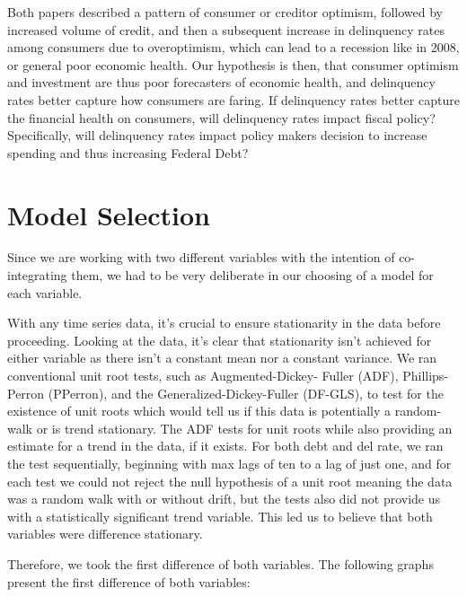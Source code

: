 \documentclass[11pt, oneside]{article}   	%
\begin{document}
	Both papers described a pattern of consumer or creditor optimism, followed by increased volume of credit, and then a subsequent increase in delinquency rates among consumers due to overoptimism, which can lead to a recession like in 2008, or general poor economic health. Our hypothesis is then, that consumer optimism and investment are thus poor forecasters of economic health, and delinquency rates better capture how consumers are faring. If delinquency rates better capture the financial health on consumers, will delinquency rates impact fiscal policy? Specifically, will delinquency rates impact policy makers decision to increase spending and thus increasing Federal Debt?

\section {Model Selection}

Since we are working with two different variables with the intention of co-integrating them, we had to be very deliberate in our choosing of a model for each variable.

With any time series data, it's crucial to ensure stationarity in the data before proceeding. Looking at the data, it's clear that stationarity isn’t achieved for either variable as there isn’t a constant mean nor a constant variance. We ran conventional unit root tests, such as Augmented-Dickey- Fuller (ADF), Phillips-Perron (PPerron), and the Generalized-Dickey-Fuller (DF-GLS), to test for the existence of unit roots which would tell us if this data is potentially a random-walk or is trend stationary. The ADF tests for unit roots while also providing an estimate for a trend in the data, if it exists. For both debt and del rate, we ran the test sequentially, beginning with max lags of ten to a lag of just one, and for each test we could not reject the null hypothesis of a unit root meaning the data was a random walk with or without drift, but the tests also did not provide us with a statistically significant trend variable. This led us to believe that both variables were difference stationary. 

Therefore, we took the first difference of both variables. The following graphs present the first difference of both variables:
\end{document}
